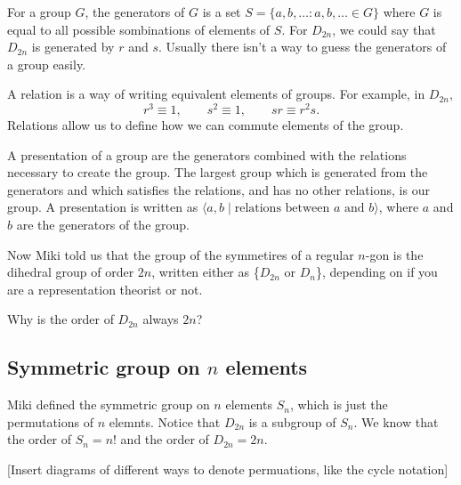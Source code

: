 \begin{definition}[Generators]
For a group $G$, the generators of $G$ is a set $ S = \{a,b,\dotsc : a,b,\dotsc \in G\}$ where $G$ is equal to all possible sombinations of elements of $S$. For $D_{2n}$, we could say that $D_{2n}$ is generated by $r$ and $s$.
Usually there isn't a way to guess the generators of a group easily.
\end{definition}

\begin{definition}[Relations]
A relation is a way of writing equivalent elements of groups. For example, in $D_{2n}$,
\[ r^3 \equiv 1, \qquad s^2 \equiv 1, \qquad sr \equiv r^2s. \]
Relations allow us to define how we can commute elements of the group.
\end{definition}

\begin{definition}[Presentation]
A presentation of a group are the generators combined with the relations necessary to create the group. The largest group which is generated from the generators and which satisfies the relations, and has no other relations, is our group. A presentation is written as $\langle a,b \mid \text{relations between $a$ and $b$} \rangle$, where $a$ and $b$ are the generators of the group.
\end{definition}

Now Miki told us that the group of the  symmetires of a regular $n$-gon is the dihedral group of order $2n$, written either as \{$D_{2n}$ or $D_{n}$\}, depending on if you are a representation theorist or not.

\begin{problem}[HW]
Why is the order of $D_{2n}$ always $2n$?
\end{problem}

\subsection{Symmetric group on \texorpdfstring{$n$}{n} elements}

Miki defined the symmetric group on $n$ elements $S_n$, which is just the permutations of $n$ elemnts. Notice that $D_{2n}$ is a subgroup of $S_n$. We know that the order of $S_n = n!$ and the order of $D_{2n} = 2n$.

[Insert diagrams of different ways to denote permuations, like the cycle notation]
